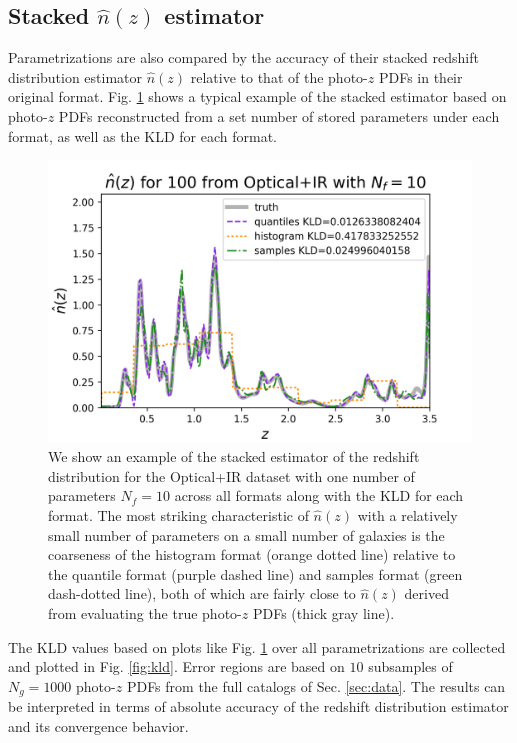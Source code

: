 \documentclass[\docopts]{\docclass}
\newcommand{\pz}{photo-$z$ PDF}
\begin{document}
\subsection{Stacked $\hat{n}(z)$ estimator}
\label{sec:stacked}

Parametrizations are also compared by the accuracy of their stacked redshift 
distribution estimator $\hat{n}(z)$ relative to that of the \pz s in their 
original format.  Fig. \ref{fig:stacked} shows a typical example of the stacked 
estimator based on \pz s reconstructed from a set number of stored parameters 
under each format, as well as the KLD for each format.

\begin{figure}
  \includegraphics[width=0.9\columnwidth]{figures/euclid_stacked.png}
  \caption{We show an example of the stacked estimator of the redshift 
distribution for the Optical+IR dataset with one number of parameters 
$N_{f}=10$ across all formats along with the KLD for each format.  The most 
striking characteristic of $\hat{n}(z)$ with a relatively small number of 
parameters on a small number of galaxies is the coarseness of the histogram 
format (orange dotted line) relative to the quantile format (purple dashed 
line) and samples format (green dash-dotted line), both of which are fairly 
close to $\hat{n}(z)$ derived from evaluating the true \pz s (thick gray line).
  \label{fig:stacked}}
\end{figure}

The KLD values based on plots like Fig. \ref{fig:stacked} over all 
parametrizations are collected and plotted in Fig. \ref{fig:kld}.  Error 
regions are based on $10$ subsamples of $N_{g}=1000$ \pz s from the full 
catalogs of Sec. \ref{sec:data}.  The results can be interpreted in terms of 
absolute accuracy of the redshift distribution estimator and its convergence 
behavior.
\end{document}
